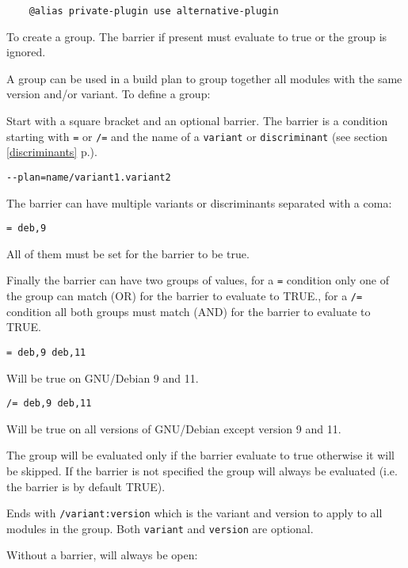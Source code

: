 \documentclass[a4paper,12pt,twoside]{article}
\newcommand{\code}[1]{\texttt{#1}}
\newcommand{\seeref}[1]{see section \ref{#1} p.\pageref{#1}}
\newcommand{\ddash}{-{}-}
\begin{document}
\begin{description}
	\begin{lstlisting}
	@alias private-plugin use alternative-plugin
	\end{lstlisting}

	\item[\code{[ <barrier> ... ] /variant:version}] To create a group. The barrier if present must evaluate to true or the group is ignored.

	A group can be used in a build plan to group together all modules with the same version and/or variant. To define a group:

	\begin{description}
		\label{plan|barrier}
		\item[ {[} <barrier>] Start with a square bracket and an optional barrier. The barrier is a condition starting with \code{=} or \code{/=} and the name of a \code{variant} or \code{discriminant} (\seeref{discriminants}).

		\code{\ddash{}plan=name/variant1.variant2}

		The barrier can have multiple variants or discriminants separated with a coma:

		\code{= deb,9}

		All of them must be set for the barrier to be true.

		Finally the barrier can have two groups of values, for a \code{=} condition only one of the group can match (OR) for the barrier to evaluate to TRUE., for a \code{/=} condition all both groups must match (AND) for the barrier to evaluate to TRUE.

		\code{= deb,9 deb,11}

		Will be true on GNU/Debian 9 and 11.

		\code{/= deb,9 deb,11}

		Will be true on all versions of GNU/Debian except version 9 and 11.

		The group will be evaluated only if the barrier evaluate to true otherwise it will be skipped. If the barrier is not specified the group will always be evaluated (i.e. the barrier is by default TRUE).

		\item[ {]} /variant:version ] Ends with \code{/variant:version} which is the variant and version to apply to all modules in the group. Both \code{variant} and \code{version} are optional.
	\end{description}

	Without a barrier, will always be open:


\end{description}
\end{document}
